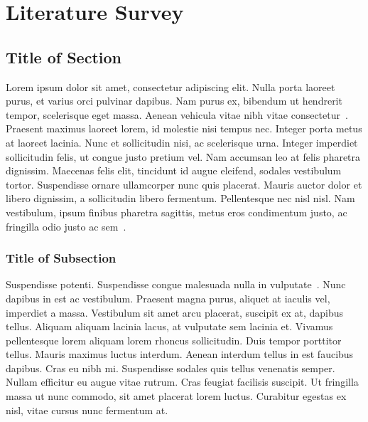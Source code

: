 
\chapter{Literature Survey}

\lipsum[1]

\section{Title of Section}

Lorem ipsum dolor sit amet, consectetur adipiscing elit. Nulla porta laoreet purus, et varius orci pulvinar dapibus. Nam purus ex, bibendum ut hendrerit tempor, scelerisque eget massa. Aenean vehicula vitae nibh vitae consectetur~\cite{ErdelyiBook}. Praesent maximus laoreet lorem, id molestie nisi tempus nec. Integer porta metus at laoreet lacinia. Nunc et sollicitudin nisi, ac scelerisque urna. Integer imperdiet sollicitudin felis, ut congue justo pretium vel. Nam accumsan leo at felis pharetra dignissim. Maecenas felis elit, tincidunt id augue eleifend, sodales vestibulum tortor. Suspendisse ornare ullamcorper nunc quis placerat. Mauris auctor dolor et libero dignissim, a sollicitudin libero fermentum. Pellentesque nec nisl nisl. Nam vestibulum, ipsum finibus pharetra sagittis, metus eros condimentum justo, ac fringilla odio justo ac sem~\cite{ErdelyiBook,JakesBook,ExtonBook}.

\lipsum[2-3]

\subsection{Title of Subsection}
\lipsum[1]

Suspendisse potenti. Suspendisse congue malesuada nulla in vulputate~\cite{SrivastavaBook,PrudnikovBookv4}. Nunc dapibus in est ac vestibulum. Praesent magna purus, aliquet at iaculis vel, imperdiet a massa. Vestibulum sit amet arcu placerat, suscipit ex at, dapibus tellus. Aliquam aliquam lacinia lacus, at vulputate sem lacinia et. Vivamus pellentesque lorem aliquam lorem rhoncus sollicitudin. Duis tempor porttitor tellus. Mauris maximus luctus interdum\cite{LeeBook1998,RyzhikBook,HoytApr1947}. Aenean interdum tellus in est faucibus dapibus. Cras eu nibh mi. Suspendisse sodales quis tellus venenatis semper. Nullam efficitur eu augue vitae rutrum. Cras feugiat facilisis suscipit. Ut fringilla massa ut nunc commodo, sit amet placerat lorem luctus. Curabitur egestas ex nisl, vitae cursus nunc fermentum at.
